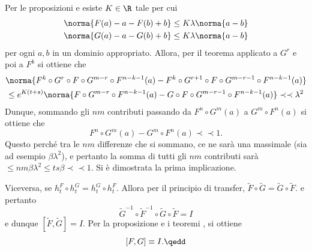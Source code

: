 {    Per le proposizioni  e  esiste $ K \in \R $ tale per cui \begin{align*}
        \norma{F(a)-a-F(b)+b} &\le K \lambda\norma{a-b}\\ 
        \norma{G(a)-a-G(b)+b} &\le K \lambda\norma{a-b}
    \end{align*}per ogni $ a,b $ in un dominio appropriato. 
    Allora, per il teorema  applicato a $ G^{r} $ e poi a $ F^{k} $ si ottiene che \begin{multline*}
        \norma{F^{k}\circ G^{r} \circ F\circ G^{m-r} \circ F^{n-k-1}(a)- F^{k}\circ G^{r+1} \circ F\circ G^{m-r-1}\circ F^{n-k-1}(a)}\\ 
        \le e^{K(t+s)}\norma{F\circ G^{m-r} \circ F^{n-k-1}(a)-G\circ F\circ G^{m-r-1}\circ F^{n-k-1}(a)}\prec\prec \lambda^{2}
    \end{multline*}Dunque, sommando gli $ nm$ contributi passando da $ F^{n}\circ G^{m}(a) $ a $ G^{m}\circ F^{n}(a)$ si ottiene che \begin{equation*}
        F^{n}\circ G^{m}(a)-G^{m}\circ F^{n}(a)\prec\prec 1.
    \end{equation*}Questo perché tra le $ nm $ differenze che si sommano, ce ne sarà una massimale (sia ad esempio $ \beta \lambda^{2} $), e pertanto la somma di tutti gli $ nm $ contributi sarà $ \le nm\beta \lambda^{2}\le ts\beta \prec\prec 1 $. Si è dimostrata la prima implicazione.

    Viceversa, se $ h_{t}^{F}\circ h_{t}^{G} = h_{t}^{G}\circ h_{t}^{F}  $. Allora per il principio di transfer, $ \tilde{F}\circ \tilde{G} = \tilde{G} \circ \tilde{F} $. e pertanto \begin{equation*}
        \tilde{G}^{-1}\circ \tilde{F}^{-1} \circ \tilde{G}\circ\tilde{F} = I
    \end{equation*}e dunque $ [\tilde{F},\tilde{G}]=I $. Per la proposizione  e i teoremi ,   si ottiene \[[F,G]\equiv I .\qedd\]
}

